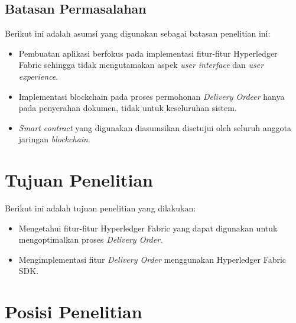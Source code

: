 

\subsection{Batasan Permasalahan}
\label{sec:batasanMasalah}
Berikut ini adalah asumsi yang digunakan sebagai batasan penelitian ini:
\begin{itemize}
	\item Pembuatan aplikasi berfokus pada implementasi fitur-fitur Hyperledger Fabric sehingga tidak mengutamakan aspek \textit{user interface} dan \textit{user experience}.
	\item Implementasi blockchain pada proses permohonan \textit{Delivery Ordeer} hanya pada penyerahan
dokumen, tidak untuk keseluruhan sistem.
	\item \textit{Smart contract} yang digunakan diasumsikan disetujui oleh seluruh anggota jaringan \textit{blockchain}.

\end{itemize}


\section{Tujuan Penelitian}
\label{sec:tujuan}
Berikut ini adalah tujuan penelitian yang dilakukan:
\begin{itemize}
	\item Mengetahui fitur-fitur Hyperledger Fabric yang dapat digunakan untuk mengoptimalkan proses \textit{Delivery Order}.
	\item Mengimplementasi fitur \textit{Delivery Order} menggunakan Hyperledger Fabric SDK.

\end{itemize}


\section{Posisi Penelitian}
\label{sec:posisiPenelitian}

